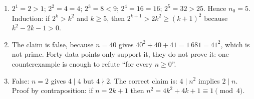 \begin{enumerate}[label=\textbf{1.\arabic*}]
  \item $2^{1}=2>1$; $2^{2}=4=4$; $2^{3}=8<9$; $2^{4}=16=16$; $2^{5}=32>25$. Hence
        $n_{0}=5$. Induction: if $2^{k}>k^{2}$ and $k\ge 5$, then
        $2^{k+1}>2k^{2}\ge(k+1)^{2}$ because $k^{2}-2k-1>0$.

  \item 
The claim is false, because $n=40$ gives $40^{2}+40+41=1\,681=41^{2}$, which
        is not prime. Forty data points only support it, they do not prove it: one
        counterexample is enough to refute ``for every $n\ge0$''.

  \item False: $n=2$ gives $4\mid 4$ but $4\nmid 2$. The correct claim is:
        $4\mid n^{2}$ implies $2\mid n$. Proof by contraposition: if
        $n=2k+1$ then $n^{2}=4k^{2}+4k+1\equiv 1 \pmod 4$.
\end{enumerate}

